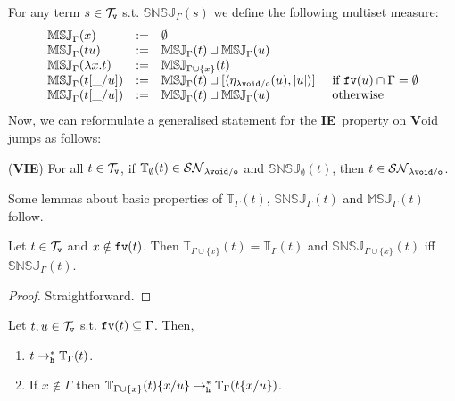 \documentclass{LMCS}
\renewcommand{\>}{\rightarrow}
\def\lam{\lambda}
\def\Gam{\Gamma}
\newcommand{\Rewn}[2][*]{\rightarrow^{#1}_{#2}}
\newcommand{\isubs}[1]{ \{ #1  \} }
\newcommand{\SN}[1]{\mathcal{SN}_{#1}}
\newcommand{\multiset}[1]{ [ #1 ] }
\newcommand{\pair}[2]{\langle #1, #2 \rangle}
\newcommand{\fv}[1]{{\tt fv}(#1)}
\newcommand{\set}[1]{ \{ #1 \}}
\newcommand{\ems}{\emptyset}
\newcommand{\termsv}{\mathcal{T}_{\tt v}}
\newcommand{\iep}{{\bf IE}}
\newcommand{\viep}{{\bf VIE}}
\newcommand{\modulo}[2]{#1/#2}
\newcommand{\osymb}{{\tt o}}
\newcommand{\aux}{{\tt void}}
\newcommand{\lauxm}{\lam\modulo{ \aux }{ \osymb }}
\newcommand{\New}{{\tt h}}
\newcommand{\snsudd}[2]{\mathbb{SNSJ}_{#1}(#2)}
\newcommand{\etamd}[2]{\mathbb{MSJ}_{#1}(#2)}
\newcommand{\surf}[2]{\mathbb{T}_{#1}(#2)}
\newcommand{\void}{\_}
\begin{document}
For any term $s\in \termsv$ s.t. $\snsudd{\Gam}{s}$ we define the following multiset measure:
\[ \begin{array}{llll}
   \etamd{\Gam}{x}  & := & \ems \\
   \etamd{\Gam}{t u} &:=& \etamd{\Gam}{t} \sqcup \etamd{\Gam}{u}\\
   \etamd{\Gam}{\lam x. t} &:=&  \etamd{\Gam \cup \set{x}}{t}\\
   \etamd{\Gam}{t[\void/u]} &:=& \etamd{\Gam}{t} \sqcup
             \multiset{\pair{\eta_{\lauxm}(u)}{|u|}}  & \mbox{ if } \fv{u} \cap \Gam = \ems\\
   \etamd{\Gam}{t[\void/u]} &:=& \etamd{\Gam}{t} \sqcup
     \etamd{\Gam}{u} & \mbox{ otherwise } \\
   
   \end{array} \] 
Now, we can reformulate a generalised statement for the \iep\ property on {\bf V}oid jumps as follows:

\begin{center}
(\viep)  For all  $t \in \termsv$, if   $\surf{\ems}{t} \in  \SN{\lauxm}$ and 
$\snsudd{\ems}{t}$, then $t \in \SN{\lauxm}$. 
\end{center}





Some lemmas about basic properties of $\surf{\Gam}{t}$, $\snsudd{\Gam}{t}$ and $\etamd{\Gam}{t}$ follow.

\begin{lem}
\label{l:surf-snsudd-no-var}
Let $t \in \termsv$ and $x \notin \fv{t}$. Then 
$\surf{\Gam\cup\set{x}}{t} =\surf{\Gam}{t}$ and 
$\snsudd{\Gam\cup\set{x}}{t}$ iff $\snsudd{\Gam}{t}$.
\end{lem}

\begin{proof}
Straightforward.
\end{proof}


\begin{lem}
\label{l:surf-sub}
Let $t, u \in \termsv$ s.t. $\fv{t} \subseteq \Gam$. Then,
\begin{enumerate}[\rm(1)]
  \item \label{p:surf-sub-one}$t\Rewn{\New}\surf{\Gam}{t}$.
  \item \label{p:surf-sub-two}If $x\notin \Gam$ then 
        $\surf{\Gam\cup\set{x}}{t}\isubs{x/u}\Rewn{\New}\surf{\Gam}{t\isubs{x/u}}$.
\end{enumerate}
\end{lem}
\end{document}
